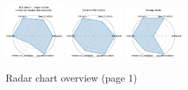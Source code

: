 \begin{figure}[ht!]
\includegraphics[width=0.1900\textwidth]{images/big-bench_beyond_the_imitation_game_benchmark_radar.pdf}
\includegraphics[width=0.1900\textwidth]{images/commonsenseqa_radar.pdf}
\includegraphics[width=0.1900\textwidth]{images/winogrande_radar.pdf}
\\[1ex]
\caption{Radar chart overview (page 1)}
\end{figure}


\clearpage


